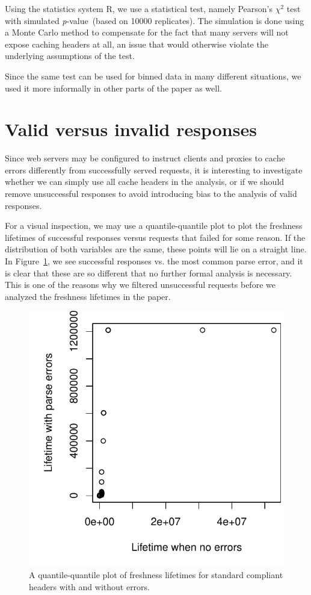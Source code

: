 \documentclass[a4paper,english]{article}
\newcommand{\pvalue}{\textit{p}-value\ }
\begin{document}
Using the statistics system R\cite{kn:r}, we use a statistical test,
namely Pearson's $\chi^2$ test with simulated \pvalue (based on 10000
replicates). The simulation is done using a Monte Carlo method to
compensate for the fact that many servers will not expose caching
headers at all, an issue that would otherwise violate the underlying
assumptions of the test.

Since the same test can be used for binned data in many different
situations, we used it more informally in other parts of the paper as well.

\section{Valid versus invalid responses}\label{app:qqplot}

Since web servers may be configured to instruct clients and proxies to
cache errors differently from successfully served requests, it is
interesting to investigate whether we can simply use all cache headers
in the analysis, or if we should remove unsuccessful responses to
avoid introducing bias to the analysis of valid responses.
 
For a visual inspection, we may use a quantile-quantile plot to plot
the freshness lifetimes of successful responses versus requests that
failed for some reason. If the distribution of both variables are the
same, these points will lie on a straight line. In
Figure~\ref{fig:errorsqq}, we see successful responses vs. the most
common parse error, and it is clear that these are so different that
no further formal analysis is necessary. This is one of the reasons
why we filtered unsuccessful requests before we analyzed the freshness
lifetimes in the paper.


\begin{figure}[h]
  \centerline{%
    \includegraphics[width=.8\textwidth]{errorsqq.pdf}}
  \caption{A quantile-quantile plot of freshness lifetimes for
    standard compliant headers with and without errors.}
  \label{fig:errorsqq}
\end{figure}



%

%
%

\end{document}
